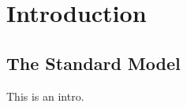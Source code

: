 \chapter{Introduction\label{ch:intro}}

\section{The Standard Model\label{sec:SM}}

This is an intro. 
